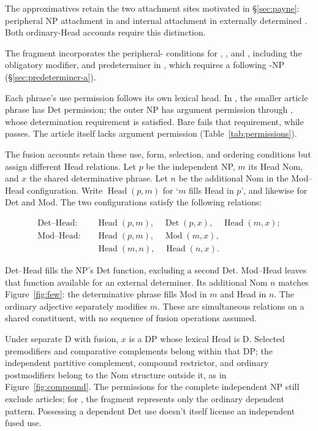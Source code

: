 \documentclass[12pt]{article}
\begin{document}
The approximatives retain the two attachment sites motivated in §\ref{sec:payne}: peripheral NP attachment in  and internal attachment in externally determined . Both ordinary-Head accounts require this distinction.

The fragment incorporates the peripheral- conditions for , , and , including the obligatory modifier, and predeterminer  in , which requires a following -NP (§\ref{sec:predeterminer-a}).

Each phrase's use permission follows its own lexical head. In , the smaller article phrase has Det permission; the outer NP has argument permission through , whose determination requirement is satisfied. Bare  fails that requirement, while  passes. The article itself lacks argument permission (Table~\ref{tab:permissions}).

The fusion accounts retain these use, form, selection, and ordering conditions but assign different Head relations. Let $p$ be the independent NP, $m$ its Head Nom, and $x$ the shared determinative phrase. Let $n$ be the additional Nom in the Mod--Head configuration. Write $\operatorname{Head}(p,m)$ for \enquote*{$m$ fills Head in $p$}, and likewise for Det and Mod. The two configurations satisfy the following relations:

\[
\begin{aligned}
\text{Det--Head:}\quad
 &\operatorname{Head}(p,m),\quad \operatorname{Det}(p,x),\quad \operatorname{Head}(m,x); \\
\text{Mod--Head:}\quad
 &\operatorname{Head}(p,m),\quad \operatorname{Mod}(m,x),\\
 &\operatorname{Head}(m,n),\quad \operatorname{Head}(n,x).
\end{aligned}
\]

Det--Head fills the NP's Det function, excluding a second Det. Mod--Head leaves that function available for an external determiner. Its additional Nom $n$ matches Figure~\ref{fig:few}: the determinative phrase fills Mod in $m$ and Head in $n$. The ordinary adjective  separately modifies $m$. These are simultaneous relations on a shared constituent, with no sequence of fusion operations assumed.

Under separate D with fusion, $x$ is a DP whose lexical Head is D. Selected premodifiers and comparative complements belong within that DP; the independent partitive complement, compound restrictor, and ordinary postmodifiers belong to the Nom structure outside it, as in Figure~\ref{fig:compound}. The permissions for the complete independent NP still exclude articles; for , the fragment represents only the ordinary dependent pattern. Possessing a dependent Det use doesn't itself license an independent fused use.
\end{document}
